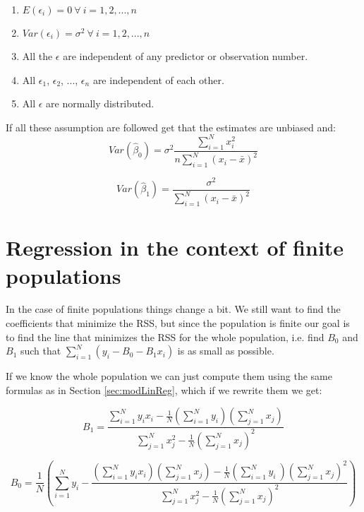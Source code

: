 \documentclass{article}
\begin{document}
\begin{enumerate}
\item $E \left( \epsilon_i \right) = 0\ \forall \ i = 1, 2, ..., n$
\item $Var \left( \epsilon_i \right) = \sigma^2\ \forall \ i = 1, 2, ..., n$
\item All the $\epsilon$ are independent of any predictor or observation number.
\item All $\epsilon_1$, $\epsilon_2$, ..., $\epsilon_n$ are independent of each other.
\item All $\epsilon$ are normally distributed.
\end{enumerate}

If all these assumption are followed get that the estimates are unbiased and:
\begin{equation*}
  Var \left( \hat{\beta}_0 \right) = \sigma^2 \frac{\sum_{i = 1}^N x_i^2}{n
    \sum_{i = 1}^N \left( x_i - \bar{x} \right)^2}
\end{equation*}
  

\begin{equation*}
  Var \left( \hat{\beta}_1 \right) = \frac{\sigma^2}{
    \sum_{i = 1}^N \left( x_i - \bar{x} \right)^2}
\end{equation*}

\section{Regression in the context of finite populations}

In the case of finite populations things change a bit. We still want to find the
coefficients that minimize the RSS, but since the population is finite our goal
is to find the line that minimizes the RSS for the whole population, i.e. find
$B_0$ and $B_1$ such that $\sum_{i = 1}^N (y_i - B_0 - B_1 x_i)$ is as small as
possible.

If we know the whole population we can just compute them using the same formulas
as in Section \ref{sec:modLinReg}, which if we rewrite them we get:

\begin{equation*}
B_1 = \frac{\sum_{i = 1}^N y_i x_i - \frac{1}{N} \left( \sum_{i = 1}^N
    y_i \right)  \left( \sum_{j = 1}^N x_j \right)}
  {\sum_{j = 1}^N x_j^2 - \frac{1}{N} \left( \sum_{j = 1}^N x_j \right)^2}
\end{equation*}

\begin{equation*}
B_0 = \frac{1}{N} \left( \sum_{i = 1}^N y_i -
  \frac{\left( \sum_{i = 1}^N y_i x_i  \right) \left( \sum_{j = 1}^N
      x_j  \right) - \frac{1}{N} \left( \sum_{i = 1}^N y_i \ \right) \left( \sum_{j = 1}^N x_j \right)^2}
  {\sum_{j = 1}^N x_j^2 - \frac{1}{N} \left( \sum_{j = 1}^N x_j \right)^2}
\right)
\end{equation*}
\end{document}
